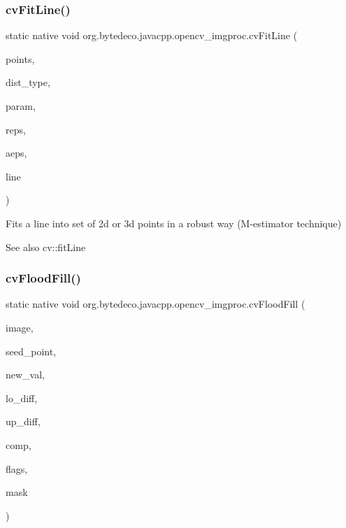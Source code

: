 \subsubsection{\texorpdfstring{cv\+Fit\+Line()}{cvFitLine()}}
{\footnotesize\ttfamily static native void org.\+bytedeco.\+javacpp.\+opencv\+\_\+imgproc.\+cv\+Fit\+Line (\begin{DoxyParamCaption}\item[{@Const Cv\+Arr}]{points,  }\item[{int}]{dist\+\_\+type,  }\item[{double}]{param,  }\item[{double}]{reps,  }\item[{double}]{aeps,  }\item[{Float\+Pointer}]{line }\end{DoxyParamCaption})\hspace{0.3cm}{\ttfamily [static]}}



Fits a line into set of 2d or 3d points in a robust way (M-\/estimator technique) 

\begin{DoxySeeAlso}{See also}
cv\+::fit\+Line 
\end{DoxySeeAlso}
\mbox{\label{group__imgproc__c_ga1e1597636792c696519945f9a56a0768}} 
\subsubsection{\texorpdfstring{cv\+Flood\+Fill()}{cvFloodFill()}}
{\footnotesize\ttfamily static native void org.\+bytedeco.\+javacpp.\+opencv\+\_\+imgproc.\+cv\+Flood\+Fill (\begin{DoxyParamCaption}\item[{Cv\+Arr}]{image,  }\item[{@By\+Val Cv\+fr.antproject.utils.Point}]{seed\+\_\+point,  }\item[{@By\+Val Cv\+Scalar}]{new\+\_\+val,  }\item[{@By\+Val(null\+Value=\char`\"{}Cv\+Scalar(cv\+Scalar\+All(0))\char`\"{}) Cv\+Scalar}]{lo\+\_\+diff,  }\item[{@By\+Val(null\+Value=\char`\"{}Cv\+Scalar(cv\+Scalar\+All(0))\char`\"{}) Cv\+Scalar}]{up\+\_\+diff,  }\item[{Cv\+Connected\+Comp}]{comp,  }\item[{int}]{flags,  }\item[{Cv\+Arr}]{mask }\end{DoxyParamCaption})\hspace{0.3cm}{\ttfamily [static]}}



